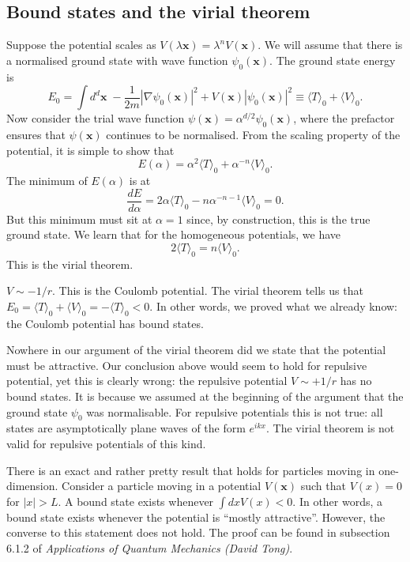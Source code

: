 \subsection{Bound states and the virial theorem}
Suppose the potential scales as $V(\lambda \bm{x}) = \lambda^n V(\bm{x})$. We will assume that there is a normalised ground state with wave function $\psi_0(\bm{x})$.
The ground state energy is
\[E_0 = \int d^d\bm{x} \; -\frac{1}{2m}|\nabla\psi_0(\bm{x})|^2 + V(\bm{x})|\psi_0(\bm{x})|^2 \equiv \langle T \rangle_0 + \langle V \rangle_0.\] 
Now consider the trial wave function $\psi(\bm{x}) = \alpha^{d/2} \psi_0(\bm{x})$, where the prefactor ensures
that $\psi(\bm{x})$ continues to be normalised. 
From the scaling property of the potential, it is simple to show that
\[E(\alpha) = \alpha^2 \langle T \rangle_0 + \alpha^{-n} \langle V \rangle_0.\]
The minimum of $E(\alpha)$ is at
\[\frac{dE}{d\alpha} = 2\alpha\langle T \rangle_0 -n\alpha^{-n-1}\langle V \rangle_0 = 0.\]
But this minimum must sit at $\alpha = 1$ since, by construction, this is the true ground state. We learn that for the homogeneous potentials, we have
\[2\langle T \rangle_0 = n\langle V \rangle_0.\]
This is the virial theorem.
\begin{example}
$V \sim -1/r$. This is the Coulomb potential. The virial theorem tells us that $E_0 = \langle T \rangle_0 +  \langle V \rangle_0 = -\langle T \rangle_0 < 0$. In other words, we proved what we already know: the Coulomb potential has bound states.
\end{example}

\begin{note}
Nowhere in our argument of the virial theorem did we state that the potential must be attractive. Our conclusion above would seem to hold for repulsive potential, yet this is clearly wrong: the repulsive potential $V \sim +1/r$ has
no bound states. 
It is because we assumed at the beginning of the argument that the ground state $\psi_0$ was normalisable. For repulsive potentials this is not true: all states are asymptotically plane waves of the form $e^{ikx}$. 
The virial theorem is not valid for repulsive potentials of this kind.
\end{note}

\noindent
There is an exact and rather pretty result that holds for particles moving in one-dimension.
Consider a particle moving in a potential $V(\bm{x})$ such that $V(x) = 0$ for $|x| > L$. A bound state exists whenever $\int dx V(x) < 0$. In other words, a bound state exists whenever the potential is ``mostly attractive''. However, the converse to this statement does not hold. The proof can be found in subsection 6.1.2 of \emph{Applications of Quantum Mechanics (David Tong)}. 

